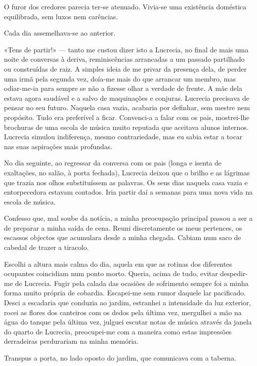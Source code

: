 O furor dos credores parecia ter-se atenuado. Vivia-se uma existência
doméstica equilibrada, sem luxos nem carências.

Cada dia assemelhava-se ao anterior.

«Tens de partir!» --- tanto me custou dizer isto a Lucrecia, no final de
mais uma noite de conversas à deriva, reminiscências arrancadas a um
passado partilhado ou construídas de raiz. A simples ideia de me privar
da presença dela, de perder uma irmã pela segunda vez, doía-me mais do
que arrancar um membro, mas odiar-me-ia para sempre se não a fizesse
olhar a verdade de frente. A mãe dela estava agora saudável e a salvo de
maquinações e conjuras. Lucrecia precisava de pensar no seu futuro.
Naquela casa vazia, acabaria por definhar, sem
mestre nem propósito. Tudo era preferível a ficar. Convenci-a a falar
com os pais, mostrei-lhe brochuras de uma escola de música muito
reputada que aceitava alunos internos. Lucrecia simulou indiferença,
mesmo contrariedade, mas eu sabia estar a tocar nas suas aspirações mais
profundas.

No dia seguinte, ao regressar da conversa com os pais (longa e isenta de
exaltações, no salão, à porta fechada), Lucrecia deixou que o brilho e
as lágrimas que trazia nos olhos substituíssem as palavras. Os seus dias
naquela casa vazia e entorpecedora estavam contados. Iria partir daí a
semanas para uma nova vida na escola de música.

Confesso que, mal soube da notícia, a minha preocupação principal passou
a ser a de preparar a minha saída de cena. Reuni discretamente os meus
pertences, os escassos objectos que acumulara desde a minha chegada.
Cabiam num saco de cabedal de trazer a tiracolo.

Escolhi a altura mais calma do dia, aquela em que as rotinas dos
diferentes ocupantes coincidiam num ponto morto. Queria, acima de tudo,
evitar despedir-me de Lucrecia. Fugir pela calada das ocasiões de
sofrimento sempre foi a minha forma muito própria de cobardia.
Escapei-me sem rumor daquele lar pacificado. Desci a escadaria que
conduzia ao jardim, estranhei a intensidade da luz exterior, rocei as
flores dos canteiros com os dedos pela última vez, mergulhei a mão na
água do tanque pela última vez, julguei escutar notas de música
através da janela do quarto de Lucrecia, preocupei-me com a maneira como
estas impressões derradeiras perdurariam na minha memória.

Transpus a porta, no lado oposto do jardim, que comunicava com a
taberna.

